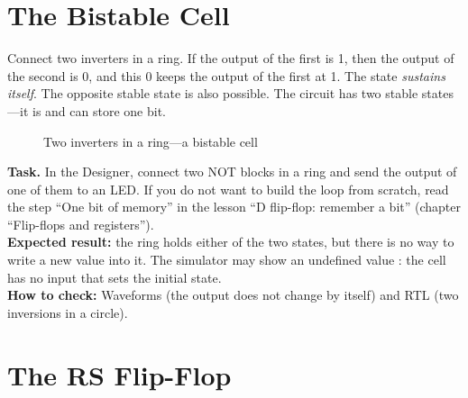 \section{The Bistable Cell}

Connect two inverters in a ring. If the output of the first is 1, then the
output of the second is 0, and this 0 keeps the output of the first at 1. The
state \emph{sustains itself}. The opposite stable state is also possible. The
circuit has two stable states---it is  and can store one bit.

\begin{figure}[H]
\centering
{}
\caption{Two inverters in a ring---a bistable cell}
\end{figure}

\begin{diybox}
\textbf{Task.}  In the Designer, connect two NOT blocks in a ring and
send the output of one of them to an LED.  If you do not want to build
the loop from scratch, read the step ``One bit of memory'' in the lesson ``D
flip-flop: remember a bit'' (chapter ``Flip-flops and registers'').\\
\textbf{Expected result:} the ring holds either of the two states, but there is
no way to write a new value into it. The simulator may show an undefined value
: the cell has no input that sets the initial state.\\
\textbf{How to check:} Waveforms (the output does not change by itself) and RTL
(two inversions in a circle).
\end{diybox}

\section{The RS Flip-Flop}

